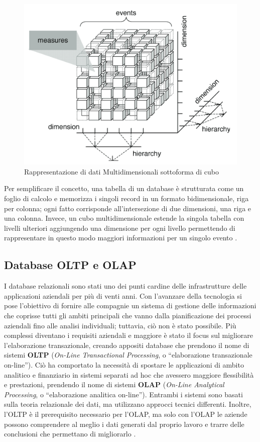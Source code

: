 \begin{figure}
    \centering
    \includegraphics[width=0.85\linewidth]{figure/capitolo_2/Multidimensional Data Cube.pdf}
    \caption{Rappresentazione di dati Multidimensionali sottoforma di cubo}
    \label{fig:Multidimensional Data Cube}
\end{figure}

Per semplificare il concetto, una tabella di un database è strutturata come un foglio di calcolo e memorizza i singoli record in un formato bidimensionale, riga per colonna; ogni fatto corrisponde all'intersezione di due dimensioni, una riga e una colonna. Invece, un cubo multidimensionale estende la singola tabella con livelli ulteriori aggiungendo una dimensione per ogni livello permettendo di rappresentare in questo modo maggiori informazioni per un singolo evento \cite{ibm_multidimensional_data}.

\subsection{Database OLTP e OLAP}

I database relazionali sono stati uno dei punti cardine delle infrastrutture delle applicazioni aziendali per più di venti anni. Con l'avanzare della tecnologia si pose l'obiettivo di fornire alle compagnie un sistema di gestione delle informazioni che coprisse tutti gli ambiti principali che vanno dalla pianificazione dei processi aziendali fino alle analisi individuali; tuttavia, ciò non è stato possibile. Più complessi diventano i requisiti aziendali e maggiore è stato il focus sul migliorare l'elaborazione transazionale, creando appositi database che prendono il nome di sistemi \textbf{OLTP} (\textit{On-Line Transactional Processing}, o ``elaborazione transazionale on-line''). Ciò ha comportato la necessità di spostare le applicazioni di ambito analitico e finanziario in sistemi separati ad hoc che avessero maggiore flessibilità e prestazioni, prendendo il nome di sistemi \textbf{OLAP} (\textit{On-Line Analytical Processing}, o ``elaborazione analitica on-line''). Entrambi i sistemi sono basati sulla teoria relazionale dei dati, ma utilizzano approcci tecnici differenti. Inoltre, l'OLTP è il prerequisito necessario per l'OLAP, ma solo con l'OLAP le aziende possono comprendere al meglio i dati generati dal proprio lavoro e trarre delle conclusioni che permettano di migliorarlo \cite{scribd_oltp_olap}.

